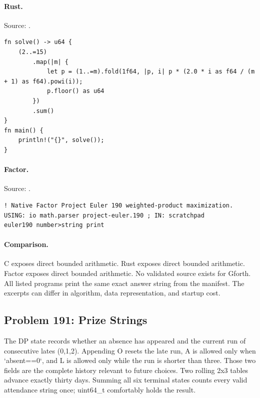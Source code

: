 \paragraph{Rust.} Source: .
\begin{lstlisting}
fn solve() -> u64 {
    (2..=15)
        .map(|m| {
            let p = (1..=m).fold(1f64, |p, i| p * (2.0 * i as f64 / (m + 1) as f64).powi(i));
            p.floor() as u64
        })
        .sum()
}
fn main() {
    println!("{}", solve());
}
\end{lstlisting}

\paragraph{Factor.} Source: .
\begin{lstlisting}
! Native Factor Project Euler 190 weighted-product maximization.
USING: io math.parser project-euler.190 ; IN: scratchpad
euler190 number>string print
\end{lstlisting}

\paragraph{Comparison.}
C exposes direct bounded arithmetic. Rust exposes direct bounded arithmetic. Factor exposes direct bounded arithmetic.
No validated source exists for Gforth.
All listed programs print the same exact answer string from the manifest. The excerpts can differ in algorithm, data representation, and startup cost.

\subsection{Problem 191: Prize Strings}
\label{walkthrough:p191}
The DP state records whether an absence has appeared and the current run of consecutive lates (0,1,2). Appending O resets the late run, A is allowed only when `absent==0`, and L is allowed only while the run is shorter than three. Those two fields are the complete history relevant to future choices. Two rolling 2x3 tables advance exactly thirty days. Summing all six terminal states counts every valid attendance string once; uint64\_t comfortably holds the result.

